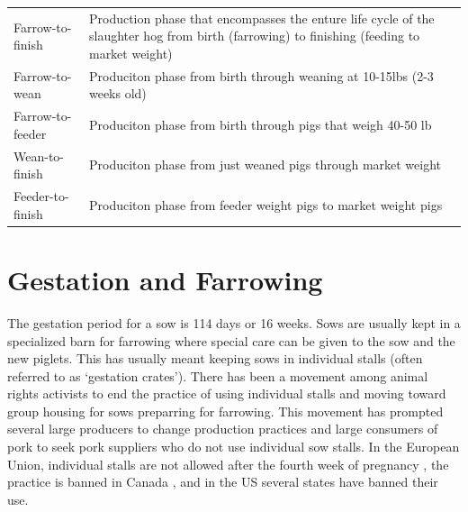 \documentclass[]{book}
\theoremstyle{definition}
\theoremstyle{definition}
\theoremstyle{remark}
\begin{document}
\begin{longtable}[]{@{}ll@{}}
\begin{minipage}[t]{0.31\columnwidth}
Farrow-to-finish\strut
\end{minipage} & \begin{minipage}[t]{0.24\columnwidth}\raggedright\strut
Production phase that encompasses the enture life cycle of the slaughter
hog from birth (farrowing) to finishing (feeding to market weight)\strut
\end{minipage}\tabularnewline
\begin{minipage}[t]{0.31\columnwidth}\raggedright\strut
Farrow-to-wean\strut
\end{minipage} & \begin{minipage}[t]{0.24\columnwidth}\raggedright\strut
Produciton phase from birth through weaning at 10-15lbs (2-3 weeks
old)\strut
\end{minipage}\tabularnewline
\begin{minipage}[t]{0.31\columnwidth}\raggedright\strut
Farrow-to-feeder\strut
\end{minipage} & \begin{minipage}[t]{0.24\columnwidth}\raggedright\strut
Produciton phase from birth through pigs that weigh 40-50 lb\strut
\end{minipage}\tabularnewline
\begin{minipage}[t]{0.31\columnwidth}\raggedright\strut
Wean-to-finish\strut
\end{minipage} & \begin{minipage}[t]{0.24\columnwidth}\raggedright\strut
Produciton phase from just weaned pigs through market weight\strut
\end{minipage}\tabularnewline
\begin{minipage}[t]{0.31\columnwidth}\raggedright\strut
Feeder-to-finish\strut
\end{minipage} & \begin{minipage}[t]{0.24\columnwidth}\raggedright\strut
Produciton phase from feeder weight pigs to market weight pigs\strut
\end{minipage}\tabularnewline
\bottomrule
\end{longtable}

\section{Gestation and Farrowing}\label{gestation-and-farrowing}

The gestation period for a sow is 114 days or 16 weeks. Sows are usually
kept in a specialized barn for farrowing where special care can be given
to the sow and the new piglets. This has usually meant keeping sows in
individual stalls (often referred to as `gestation crates'). There has
been a movement among animal rights activists to end the practice of
using individual stalls and moving toward group housing for sows
preparring for farrowing. This movement has prompted several large
producers to change production practices and large consumers of pork to
seek pork suppliers who do not use individual sow stalls. In the
European Union, individual stalls are not allowed after the fourth week
of pregnancy \citep{eugestation}, the practice is banned in Canada , and
in the US several states have banned their use.
\end{document}
